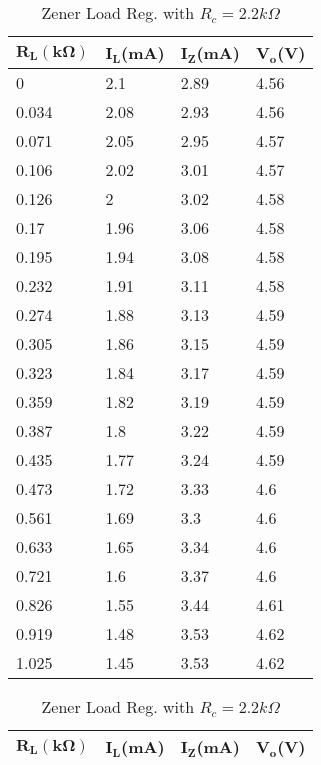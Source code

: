 \documentclass{scrartcl}
\newcommand{\1}{\mathbbm{1}}
\begin{document}
\begin{table}[!htb]
    \begin{minipage}{.45\linewidth}
		\centering
			\begin{tabular}{|l|l|l|l|}
			\hline
				\textbf{$\pmb{R_L(k\Omega)}$} & \textbf{$\pmb{I_L}$(mA)} & 
				\textbf{$\pmb{I_Z}$(mA)} & \textbf{$\pmb{V_o}$(V)} \\ \hline
				0 & 2.1 & 2.89 & 4.56 \\ \hline
				0.034 & 2.08 & 2.93 & 4.56 \\ \hline
				0.071 & 2.05 & 2.95 & 4.57 \\ \hline
				0.106 & 2.02 & 3.01 & 4.57 \\ \hline
				0.126 & 2 & 3.02 & 4.58 \\ \hline
				0.17 & 1.96 & 3.06 & 4.58 \\ \hline
				0.195 & 1.94 & 3.08 & 4.58 \\ \hline
				0.232 & 1.91 & 3.11 & 4.58 \\ \hline
				0.274 & 1.88 & 3.13 & 4.59 \\ \hline
				0.305 & 1.86 & 3.15 & 4.59 \\ \hline
				0.323 & 1.84 & 3.17 & 4.59 \\ \hline
				0.359 & 1.82 & 3.19 & 4.59 \\ \hline
				0.387 & 1.8 & 3.22 & 4.59 \\ \hline
				0.435 & 1.77 & 3.24 & 4.59 \\ \hline
				0.473 & 1.72 & 3.33 & 4.6 \\ \hline
				0.561 & 1.69 & 3.3 & 4.6 \\ \hline
				0.633 & 1.65 & 3.34 & 4.6 \\ \hline
				0.721 & 1.6 & 3.37 & 4.6 \\ \hline
				0.826 & 1.55 & 3.44 & 4.61 \\ \hline
				0.919 & 1.48 & 3.53 & 4.62 \\ \hline
				1.025 & 1.45 & 3.53 & 4.62 \\ \hline
			\end{tabular}
			\caption{Zener Load Reg. with $R_c = 2.2 k\Omega$}
			\label{ZDload2.2ohm}
    \end{minipage}%
    \begin{minipage}{.5\linewidth}
      \centering
    \begin{tabular}{|l|l|l|l|}
    \hline
        \textbf{$\pmb{R_L(k\Omega)}$} & \textbf{$\pmb{I_L}$(mA)} 
		& \textbf{$\pmb{I_Z}$(mA)} & \textbf{$\pmb{V_o}$(V)} \\ \hline

\end{tabular}
\end{minipage}
\end{table}
\end{document}
